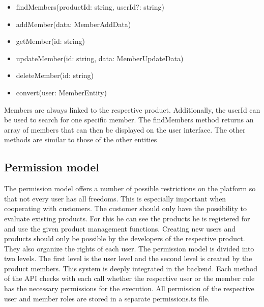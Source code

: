     \begin{itemize}
        \item findMembers(productId: string, userId?: string)
        \item addMember(data: MemberAddData)
        \item getMember(id: string)
        \item updateMember(id: string, data: MemberUpdateData)
        \item deleteMember(id: string)
        \item convert(user: MemberEntity)
    \end{itemize}

    Members are always linked to the respective product. Additionally, the userId can be used to search for one specific member. The findMembers method returns an array of members that can then be displayed on the user interface.
    The other methods are similar to those of the other entities

    \subsection*{Permission model}
    The permission model offers a number of possible restrictions on the platform so that not every user has all freedoms. This is especially important when cooperating with customers. The customer should only have the possibility to evaluate existing products. For this he can see the products he is registered for and use the given product management functions. Creating new users and products should only be possible by the developers of the respective product. They also organize the rights of each user. The permission model is divided into two levels. The first level is the user level and the second level is created by the product members. This system is deeply integrated in the backend. Each method of the API checks with each call whether the respective user or the member role has the necessary permissions for the execution. All permission of the respective user and member roles are stored in a separate permissions.ts file. 

